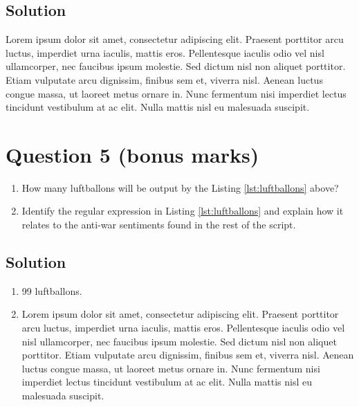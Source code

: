 \documentclass[
  UTF8, %
  12pt, %
]{assignment}
\begin{document}

\subsection*{Solution}

Lorem ipsum dolor sit amet, consectetur adipiscing elit. Praesent porttitor arcu luctus, imperdiet urna iaculis, mattis eros. Pellentesque iaculis odio vel nisl ullamcorper, nec faucibus ipsum molestie. Sed dictum nisl non aliquet porttitor. Etiam vulputate arcu dignissim, finibus sem et, viverra nisl. Aenean luctus congue massa, ut laoreet metus ornare in. Nunc fermentum nisi imperdiet lectus tincidunt vestibulum at ac elit. Nulla mattis nisl eu malesuada suscipit.


\section*{Question 5 (bonus marks)}

\begin{problem}

\begin{enumerate}[label=(\arabic*),ref=\arabic*]
  \item How many luftballons will be output by the Listing \ref{lst:luftballons} above?
  \item Identify the regular expression in Listing \ref{lst:luftballons} and explain how it relates to the anti-war sentiments found in the rest of the script.
\end{enumerate}

\end{problem}


\subsection*{Solution}

\begin{enumerate}[label=(\arabic*),ref=\arabic*]
  \item 99 luftballons.
  \item Lorem ipsum dolor sit amet, consectetur adipiscing elit. Praesent porttitor arcu luctus, imperdiet urna iaculis, mattis eros. Pellentesque iaculis odio vel nisl ullamcorper, nec faucibus ipsum molestie. Sed dictum nisl non aliquet porttitor. Etiam vulputate arcu dignissim, finibus sem et, viverra nisl. Aenean luctus congue massa, ut laoreet metus ornare in. Nunc fermentum nisi imperdiet lectus tincidunt vestibulum at ac elit. Nulla mattis nisl eu malesuada suscipit.
\end{enumerate}
\end{document}
